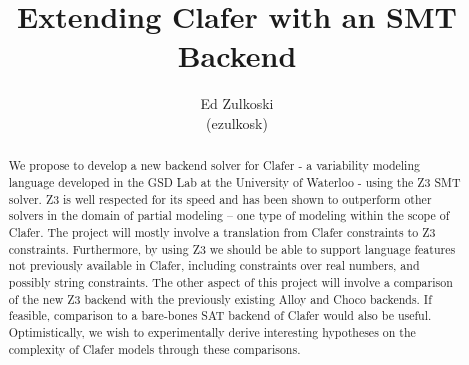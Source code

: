 \documentclass{article}
\begin{document}
\newenvironment{myenumerate}{%
  \edef\backupindent{\the\parindent}%
  \itemize%
  \setlength{\parindent}{\backupindent}%
}{\endenumerate}

\title{Extending Clafer with an SMT Backend}	
\author{Ed Zulkoski \\
(ezulkosk)}

\maketitle
\begin{abstract}
We propose to develop a new backend solver for Clafer - a variability modeling language developed in the GSD Lab at the University of Waterloo - using the Z3 SMT solver. Z3 is well respected for its speed and has been shown to outperform other solvers in the domain of partial modeling -- one type of modeling within the scope of Clafer. The project will mostly involve a translation from Clafer constraints to Z3 constraints. Furthermore, by using Z3 we should be able to support language features not previously available in Clafer, including constraints over real numbers, and possibly string constraints. The other aspect of this project will involve a comparison of the new Z3 backend with the previously existing Alloy and Choco backends. If feasible, comparison to a bare-bones SAT backend of Clafer would also be useful. Optimistically, we wish to experimentally derive interesting hypotheses on the complexity of Clafer models through these comparisons. 
\end{abstract}
\end{document}
